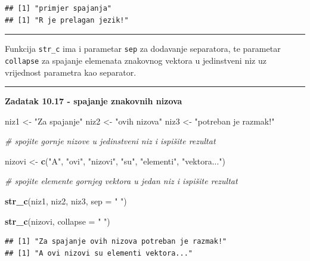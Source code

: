 \documentclass[]{book}
\newenvironment{Shaded}{\begin{snugshade}}{\end{snugshade}}
\newcommand{\KeywordTok}[1]{\textcolor[rgb]{0.13,0.29,0.53}{\textbf{#1}}}
\newcommand{\DataTypeTok}[1]{\textcolor[rgb]{0.13,0.29,0.53}{#1}}
\newcommand{\StringTok}[1]{\textcolor[rgb]{0.31,0.60,0.02}{#1}}
\newcommand{\CommentTok}[1]{\textcolor[rgb]{0.56,0.35,0.01}{\textit{#1}}}
\newcommand{\NormalTok}[1]{#1}
\theoremstyle{definition}
\theoremstyle{definition}
\theoremstyle{definition}
\theoremstyle{remark}
\begin{document}
\begin{verbatim}
## [1] "primjer spajanja"
## [1] "R je prelagan jezik!"
\end{verbatim}

\begin{center}\rule{0.5\linewidth}{\linethickness}\end{center}

Funkcija \texttt{str\_c} ima i parametar \texttt{sep} za dodavanje
separatora, te parametar \texttt{collapse} za spajanje elemenata
znakovnog vektora u jedinstveni niz uz vrijednost parametra kao
separator.

\begin{center}\rule{0.5\linewidth}{\linethickness}\end{center}

\textbf{Zadatak 10.17 - spajanje znakovnih nizova}

\begin{Shaded}
\begin{Highlighting}[]
\NormalTok{niz1 <-}\StringTok{ "Za spajanje"}
\NormalTok{niz2 <-}\StringTok{ "ovih nizova"}
\NormalTok{niz3 <-}\StringTok{ "potreban je razmak!"}

\CommentTok{# spojite gornje nizove u jedinstveni niz i ispišite rezultat}

\NormalTok{nizovi <-}\StringTok{ }\KeywordTok{c}\NormalTok{(}\StringTok{"A"}\NormalTok{, }\StringTok{"ovi"}\NormalTok{, }\StringTok{"nizovi"}\NormalTok{, }\StringTok{"su"}\NormalTok{, }\StringTok{"elementi"}\NormalTok{, }\StringTok{"vektora..."}\NormalTok{)}

\CommentTok{# spojite elemente gornjeg vektora u jedan niz i ispišite rezultat}
\end{Highlighting}
\end{Shaded}

\begin{Shaded}
\begin{Highlighting}[]
\KeywordTok{str_c}\NormalTok{(niz1, niz2, niz3, }\DataTypeTok{sep =} \StringTok{" "}\NormalTok{)}

\KeywordTok{str_c}\NormalTok{(nizovi, }\DataTypeTok{collapse =} \StringTok{" "}\NormalTok{)}
\end{Highlighting}
\end{Shaded}

\begin{verbatim}
## [1] "Za spajanje ovih nizova potreban je razmak!"
## [1] "A ovi nizovi su elementi vektora..."
\end{verbatim}
\end{document}
